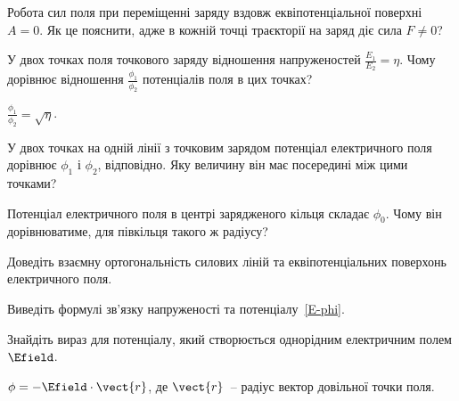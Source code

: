 \begin{problem}
    Робота сил поля при переміщенні заряду вздовж еквіпотенціальної поверхні $A = 0$. Як це пояснити, адже в кожній точці траєкторії на заряд діє сила $F \neq 0$?

\end{problem}

\begin{problem}
    У двох точках поля точкового заряду відношення напруженостей $\frac{E_1}{E_2} = \eta$. Чому дорівнює відношення $\frac{\phi_1}{\phi_2}$ потенціалів поля в цих точках?
\begin{solution}
	$\frac{\phi_1}{\phi_2} =\sqrt\eta$. 
\end{solution}
\end{problem}

\begin{problem}
    У двох точках на одній лінії з точковим зарядом потенціал електричного поля дорівнює $\phi_1$ і $\phi_2$, відповідно. Яку величину він має посередині між цими точками?

\end{problem}

\begin{problem}
    Потенціал електричного поля в центрі зарядженого кільця складає $\phi_0$. Чому він дорівнюватиме, для півкільця такого ж радіусу?
\end{problem}

\begin{problem}
    Доведіть взаємну ортогональність силових ліній та еквіпотенціальних поверхонь електричного поля.
\end{problem}

\begin{problem}
    Виведіть формулі зв'язку напруженості та потенціалу~\eqref{E-phi}. 
\end{problem}

\begin{problem}
    Знайдіть вираз для потенціалу, який створюється однорідним електричним полем $\Efield$.
\begin{solution}
	$\phi = -\Efield\cdot\vect{r}$, де $\vect{r}$~-- радіус вектор довільної точки поля.
\end{solution}
\end{problem}

